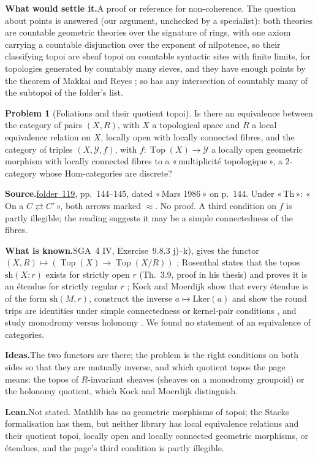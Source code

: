 \documentclass[11pt]{article}
\newcommand{\q}[1]{«\,#1\,»}
\newcommand{\fac}[1]{\href{https://grothendieck.umontpellier.fr/#1.pdf}{folder~#1}}
\newcommand{\Top}{\operatorname{Top}}
\theoremstyle{definition}
\newtheorem{problem}{Problem}
\theoremstyle{plain}\newtheorem*{proposition}{Proposition}\theoremstyle{definition}
\newcommand{\entry}[1]{\par\medskip\noindent\textbf{#1}\enspace}
\newcommand{\src}[1]{\entry{Source.}#1}
\newcommand{\known}{\entry{What is known.}}
\newcommand{\ideas}{\entry{Ideas.}}
\newcommand{\leanst}{\entry{Lean.}}
\newcommand{\settle}{\entry{What would settle it.}}
\begin{document}
\settle A proof or reference for non-coherence. The question about points is answered (our argument, unchecked by a specialist): both theories are countable geometric theories over the signature of rings, with one axiom carrying a countable disjunction over the exponent of nilpotence, so their classifying topoi are sheaf topoi on countable syntactic sites with finite limits, for topologies generated by countably many sieves, and they have enough points by the theorem of Makkai and Reyes \cite[Thm~6.2.4]{makkaireyes}; so has any intersection of countably many of the subtopoi of the folder's list.

\begin{problem}[Foliations and their quotient topoi]\label{p:fol}
Is there an equivalence between the category of pairs $(X, R)$, with $X$ a topological space and $R$ a local equivalence relation on $X$, locally open with locally connected fibres, and the category of triples $(X, \mathcal Y, f)$, with $f : \Top(X) \to \mathcal Y$ a locally open geometric morphism with locally connected fibres to a \q{multiplicité topologique}, a $2$-category whose Hom-categories are discrete?
\end{problem}

\src{\fac{119}, pp.~144--145, dated \q{Mars 1986} on p.~144. Under \q{Th}: \q{On a $C \rightleftarrows C'$}, both arrows marked $\approx$. No proof. A third condition on $f$ is partly illegible; the reading suggests it may be a simple connectedness of the fibres.}

\known SGA~4 IV, Exercise~9.8.3 j)--k), gives the functor $(X, R) \mapsto (\Top(X) \to \Top(X/R))$ \cite{sga4}; Rosenthal states that the topos $\mathrm{sh}(X; r)$ exists for strictly open $r$ (Th.~3.9, proof in his thesis) and proves it is an étendue for strictly regular $r$ \cite{rosenthal}; Kock and Moerdijk show that every étendue is of the form $\mathrm{sh}(M, r)$, construct the inverse $a \mapsto \mathrm{Lker}(a)$ and show the round trips are identities under simple connectedness or kernel-pair conditions \cite{kockmoerdijk1992}, and study monodromy versus holonomy \cite{kockmoerdijk1996}. We found no statement of an equivalence of categories.

\ideas The two functors are there; the problem is the right conditions on both sides so that they are mutually inverse, and which quotient topos the page means: the topos of $R$-invariant sheaves (sheaves on a monodromy groupoid) or the holonomy quotient, which Kock and Moerdijk distinguish.

\leanst Not stated. Mathlib has no geometric morphisms of topoi; the Stacks formalisation \cite{axiomstacks} has them, but neither library has local equivalence relations and their quotient topoi, locally open and locally connected geometric morphisms, or étendues, and the page's third condition is partly illegible.
\end{document}

